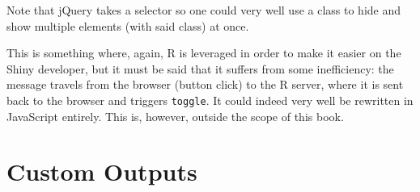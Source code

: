 \documentclass[10pt,]{krantz}
\makeatletter
\newenvironment{Shaded}{\begin{snugshade}}{\end{snugshade}}
\newcommand{\ControlFlowTok}[1]{\textcolor[rgb]{0.27,0.27,0.27}{\textbf{#1}}}
\newcommand{\DataTypeTok}[1]{\textcolor[rgb]{0.27,0.27,0.27}{#1}}
\newcommand{\KeywordTok}[1]{\textcolor[rgb]{0.27,0.27,0.27}{\textbf{#1}}}
\newcommand{\NormalTok}[1]{#1}
\newcommand{\OperatorTok}[1]{\textcolor[rgb]{0.43,0.43,0.43}{\textbf{#1}}}
\newcommand{\StringTok}[1]{\textcolor[rgb]{0.5,0.5,0.5}{#1}}
\newenvironment{kframe}{%
\medskip{}
\setlength{\fboxsep}{.8em}
 \def\at@end@of@kframe{}%
 \ifinner\ifhmode%
  \def\at@end@of@kframe{\end{minipage}}%
  \begin{minipage}{\columnwidth}%
 \fi\fi%
 \def\FrameCommand##1{\hskip\@totalleftmargin \hskip-\fboxsep
 \colorbox{shadecolor}{##1}\hskip-\fboxsep
     \hskip-\linewidth \hskip-\@totalleftmargin \hskip\columnwidth}%
 \MakeFramed {\advance\hsize-\width
   \@totalleftmargin\z@ \linewidth\hsize
   \@setminipage}}%
 {\par\unskip\endMakeFramed%
 \at@end@of@kframe}
\renewenvironment{Shaded}{\begin{kframe}}{\end{kframe}}
\makeatother
\begin{document}
Note that jQuery takes a selector so one could very well use a class to hide and show multiple elements (with said class) at once.

\begin{Shaded}
\end{Shaded}

This is something where, again, R is leveraged in order to make it easier on the Shiny developer, but it must be said that it suffers from some inefficiency: the message travels from the browser (button click) to the R server, where it is sent back to the browser and triggers \texttt{toggle}. It could indeed very well be rewritten in JavaScript entirely. This is, however, outside the scope of this book.

\hypertarget{shiny-output}{%
\chapter{Custom Outputs}\label{shiny-output}}
\end{document}
